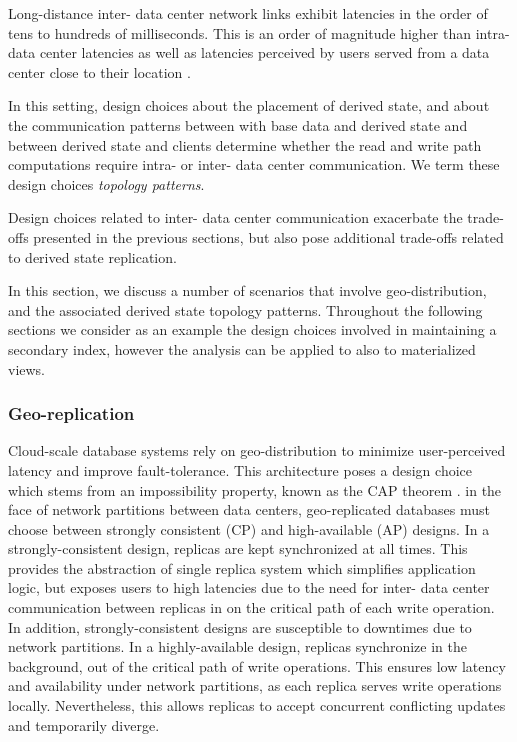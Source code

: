 Long-distance inter- data center network links exhibit latencies in the order of tens to hundreds of milliseconds.
This is an order of magnitude higher than intra- data center latencies as well as latencies perceived by users served
from a data center close to their location \cite{kleppmann:localfirst}.

In this setting, design choices about the placement of derived state,
and about the communication patterns between with base data and derived state and between derived state and clients
determine whether the read and write path computations require intra- or inter- data center communication.
We term these design choices \textit{topology patterns}.

Design choices related to inter- data center communication exacerbate the trade-offs presented in the previous sections,
but also pose additional trade-offs related to derived state replication.

In this section, we discuss a number of scenarios that involve geo-distribution, and the associated derived state
topology patterns.
Throughout the following sections we consider as an example the design choices involved in maintaining a secondary index,
however the analysis can be applied to also to materialized views.

\subsubsection{Geo-replication}
Cloud-scale database systems rely on geo-distribution to minimize user-perceived latency and improve fault-tolerance.
This architecture poses a design choice which stems from an impossibility property, known as the CAP theorem
\cite{brewer:cap}.
in the face of network partitions between data centers, geo-replicated databases must choose between strongly consistent
(CP) and high-available (AP) designs.
In a strongly-consistent design, replicas are kept synchronized at all times.
This provides the abstraction of single replica system which simplifies application logic, but exposes users to high
latencies due to the need for inter- data center communication between replicas in on the critical path of each write
operation.
In addition, strongly-consistent designs are susceptible to downtimes due to network partitions.
In a highly-available design, replicas synchronize in the background, out of the critical path of write operations.
This ensures low latency and availability under network partitions, as each replica serves write operations locally.
Nevertheless, this allows replicas to accept concurrent conflicting updates and temporarily diverge.

